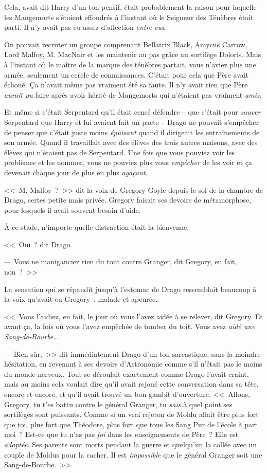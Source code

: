Cela, avait dit Harry d'un ton pensif, était probablement la raison pour laquelle les Mangemorts s'étaient effondrés à l'instant où le Seigneur des Ténèbres était parti. Il n'y avait pas eu assez d'affection \emph{entre eux}.

On pouvait recruter un groupe comprenant Bellatrix Black, Amycus Carrow, Lord Malfoy, M. MacNair et les maintenir au pas grâce au sortilège Doloris. Mais à l'instant où le maître de la marque des ténèbres partait, vous n'aviez plus une armée, seulement un cercle de connaissances. C'était pour cela que Père avait échoué. Ça n'avait même pas vraiment été sa faute. Il n'y avait rien que Père \emph{aurait pu} faire après avoir hérité de Mangemorts qui n'étaient pas vraiment \emph{amis}.

Et même si c'était Serpentard qu'il était censé défendre -- que c'était pour \emph{sauver} Serpentard que Harry et lui avaient fait un pacte -- Drago ne pouvait s'empêcher de penser que c'était juste moins \emph{épuisant} quand il dirigeait les entraînements de son armée. Quand il travaillait avec des élèves des trois autres maisons, avec des élèves qui n'étaient pas de Serpentard. Une fois que vous pouviez voir les problèmes et les nommer, vous ne pouviez plus vous \emph{empêcher} de les voir et ça devenait chaque jour de plus en plus \emph{agaçant}.

<<~M. Malfoy~?~>> dit la voix de Gregory Goyle depuis le sol de la chambre de Drago, certes petite mais privée. Gregory faisait ses devoirs de métamorphose, pour lesquels il avait souvent besoin d'aide.

À ce stade, n'importe quelle distraction était la bienvenue.

<<~Oui~? dit Drago.

--- Vous ne maniganciez rien du tout contre Granger, dit Gregory, en fait, non~?~>>

La sensation qui se répandit jusqu'à l'estomac de Drago ressemblait beaucoup à la voix qu'avait eu Gregory~: malade et apeurée.

<<~Vous l'aidiez, en fait, le jour où vous l'avez aidée à se relever, dit Gregory. Et avant ça, la fois où vous l'avez empêchée de tomber du toit. Vous avez \emph{aidé une Sang-de-Bourbe}…

--- Bien sûr,~>> dit immédiatement Drago d'un ton sarcastique, sans la moindre hésitation, en revenant à ses devoirs d'Astronomie comme s'il n'était pas le moins du monde nerveux. Tout se déroulait exactement comme Drago l'avait craint, mais au moins cela voulait dire qu'il avait rejoué cette conversation dans sa tête, encore et encore, et qu'il avait trouvé un bon gambit d'ouverture. <<~Allons, Gregory, tu t'es battu contre le général Granger, tu \emph{sais} à quel point ses sortilèges sont puissants. Comme si un vrai rejeton de Moldu allait être plus fort que toi, plus fort que Théodore, plus fort que tous les Sang Pur de l'école à part moi~? Est-ce que tu n'as pas \emph{foi} dans les enseignements de Père~? Elle est \emph{adoptée}. Ses parents sont morts pendant la guerre et quelqu'un la collée avec un couple de Moldus pour la cacher. Il est \emph{impossible} que le général Granger soit une Sang-de-Bourbe.~>>

